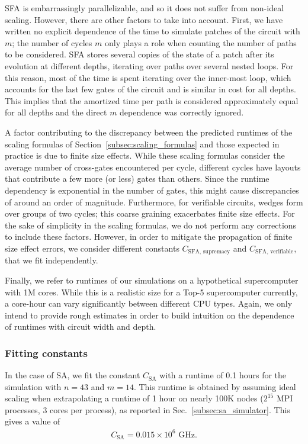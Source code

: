 SFA is embarrassingly parallelizable, and so it does not suffer from non-ideal scaling. However, there are other factors to take into account. First, we have written no explicit dependence of the time to simulate patches of the circuit with $m$; the number of cycles $m$ only plays a role when counting the number of paths to be considered. SFA stores several copies of the state of a patch after its evolution at different depths, iterating over paths over several nested loops. For this reason, most of the time is spent iterating over the inner-most loop, which accounts for the last few gates of the circuit and is similar in cost for all depths. This implies that the amortized time per path is considered approximately equal for all depths and the direct $m$ dependence was correctly ignored.

A factor contributing to the discrepancy between the predicted runtimes of the scaling formulas of Section~\ref{subsec:scaling_formulas} and those expected in practice is due to finite size effects. While these scaling formulas consider the average number of cross-gates encountered per cycle, different cycles have layouts that contribute a few more (or less) gates than others. Since the runtime dependency is exponential in the number of gates, this might cause discrepancies of around an order of magnitude. Furthermore, for verifiable circuits, wedges form over groups of two cycles; this coarse graining exacerbates finite size effects. For the sake of simplicity in the scaling formulas, we do not perform any corrections to include these factors. However, in order to mitigate the propagation of finite size effect errors, we consider different constants $C_{\text{SFA, supremacy}}$ and $C_{\text{SFA, verifiable}}$, that we fit independently.

Finally, we refer to runtimes of our simulations on a hypothetical supercomputer with 1M cores. While this is a realistic size for a Top-5 supercomputer currently, a core-hour can vary significantly between different CPU types. Again, we only intend to provide rough estimates in order to build intuition on the dependence of runtimes with circuit width and depth.


\subsubsection{Fitting constants}
\label{subsec:fitting}

In the case of SA, we fit the constant $C_{\text{SA}}$ with a runtime of 0.1 hours for the simulation with $n=43$ and $m=14$. This runtime is obtained by assuming ideal scaling when extrapolating a runtime of 1 hour on nearly 100K nodes ($2^{15}$ MPI processes, 3 cores per process), as reported in Sec.~\ref{subsec:sa_simulator}. This gives a value of
\begin{align}
\label{eq:fit_sa}
    C_{\text{SA}} = 0.015 \times 10^{6} \text{ GHz.}
\end{align}
\\

